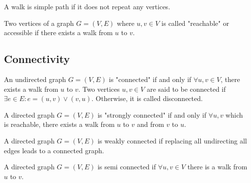 \documentclass[a4paper]{article}
\theoremstyle{plain}
\theoremstyle{definition}
\newtheorem{defn}{Definition}[section]
\theoremstyle{remark}
\begin{document}
 \begin{tcolorbox}[colback=black!3!white,colframe=black!60!white,title=\begin{defn}Simple Path \label{Simple Path}\end{defn}]
 A walk is simple path if it does not repeat any vertices.
 \end{tcolorbox}
 \begin{tcolorbox}[colback=black!3!white,colframe=black!60!white,title=\begin{defn}Reachability \label{Reachability}\end{defn}]
 Two vertices of a graph $G=(V,E)$ where $u,v \in V$ is called "reachable" or accessible if there exists a walk from $u$ to $v$.
 \end{tcolorbox}
 \subsection{Connectivity}
 \begin{tcolorbox}[colback=black!3!white,colframe=black!60!white,title=\begin{defn}Connectedness \label{Connectedness}\end{defn}]
 An undirected graph $G=(V,E)$ is "connected" if and only if $\forall u,v \in V$, there exists a walk from $u$ to $v$. Two vertices $u,v \in V$ are said to be connected if $\exists e \in E : e = (u,v) \lor (v,u)$. Otherwise, it is called disconnected. 
 \end{tcolorbox}
 \begin{tcolorbox}[colback=black!3!white,colframe=black!60!white,title=\begin{defn}Strongly connected \label{Strongly connected}\end{defn}]
 A directed graph $G=(V,E)$ is "strongly connected" if and only if $\forall u,v$ which is reachable, there exists a walk from $u$ to $v$ and from $v$ to $u$.
 \end{tcolorbox}
\begin{tcolorbox}[colback=black!3!white,colframe=black!60!white,title=\begin{defn}Weakly connected \label{Weakly connected}\end{defn}]
A directed graph  $G = (V,E)$ is weakly connected if replacing all undirecting all edges leads to a connected graph.
\end{tcolorbox}
\begin{tcolorbox}[colback=black!3!white,colframe=black!60!white,title=\begin{defn}Semi connectedness \label{Semi connectedness}\end{defn}]
A directed graph $G = (V,E)$ is semi connected if $\forall u,v \in V$ there is a walk from $u$ to $v$. 
\end{tcolorbox}
\end{document}
